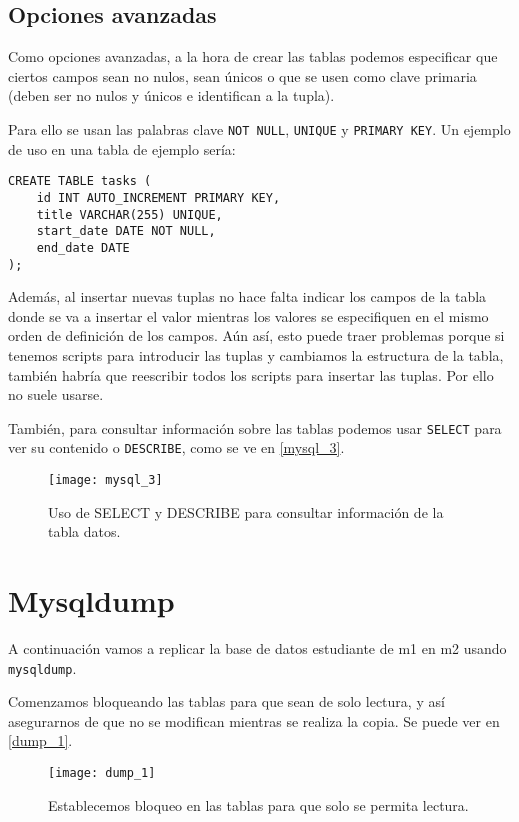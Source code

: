\section{Opciones avanzadas}

Como opciones avanzadas, a la hora de crear las tablas podemos especificar que ciertos campos sean no nulos, sean únicos o que se usen como clave primaria (deben ser no nulos y únicos e identifican a la tupla).

Para ello se usan las palabras clave \verb|NOT NULL|, \verb|UNIQUE| y \verb|PRIMARY KEY|. Un ejemplo de uso en una tabla de ejemplo sería:

\begin{verbatim}
CREATE TABLE tasks (
    id INT AUTO_INCREMENT PRIMARY KEY,
    title VARCHAR(255) UNIQUE,
    start_date DATE NOT NULL,
    end_date DATE
);
\end{verbatim}

Además, al insertar nuevas tuplas no hace falta indicar los campos de la tabla donde se va a insertar el valor mientras los valores se especifiquen en el mismo orden de definición de los campos. Aún así, esto puede traer problemas porque si tenemos scripts para introducir las tuplas y cambiamos la estructura de la tabla, también habría que reescribir todos los scripts para insertar las tuplas. Por ello no suele usarse.

También, para consultar información sobre las tablas podemos usar \verb|SELECT| para ver su contenido o \verb|DESCRIBE|, como se ve en \eqref{mysql_3}.

\begin{figure}[h!]
\begin{center}
\caption{Uso de SELECT y DESCRIBE para consultar información de la tabla datos.}
\label{mysql_3}
\texttt{[image: mysql\_3]}
\end{center}
\end{figure}

\chapter{Mysqldump}

A continuación vamos a replicar la base de datos estudiante de m1 en m2 usando \verb|mysqldump|.

Comenzamos bloqueando las tablas para que sean de solo lectura, y así asegurarnos de que no se modifican mientras se realiza la copia. Se puede ver en \eqref{dump_1}.

\begin{figure}[h!]
\begin{center}
\caption{Establecemos bloqueo en las tablas para que solo se permita lectura.}
\label{dump_1}
\texttt{[image: dump\_1]}
\end{center}
\end{figure}

